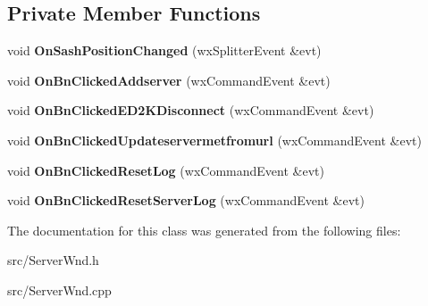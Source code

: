 \subsection*{Private Member Functions}
\begin{DoxyCompactItemize}
\item 
void {\bfseries OnSashPositionChanged} (wxSplitterEvent \&evt)\label{classCServerWnd_a209bde7a2852a45ce20ffd7cfff11358}

\item 
void {\bfseries OnBnClickedAddserver} (wxCommandEvent \&evt)\label{classCServerWnd_a58752743e91cf3ee19493b895c99cf4d}

\item 
void {\bfseries OnBnClickedED2KDisconnect} (wxCommandEvent \&evt)\label{classCServerWnd_a1a47fa31e9bd27b433d5df1235218f75}

\item 
void {\bfseries OnBnClickedUpdateservermetfromurl} (wxCommandEvent \&evt)\label{classCServerWnd_a62b8df871053eb3c71b635cb706f5a6d}

\item 
void {\bfseries OnBnClickedResetLog} (wxCommandEvent \&evt)\label{classCServerWnd_a84bb2c936b8138be6d76564ecc192ed2}

\item 
void {\bfseries OnBnClickedResetServerLog} (wxCommandEvent \&evt)\label{classCServerWnd_a1339abca10a1526049657a08e0264523}

\end{DoxyCompactItemize}


The documentation for this class was generated from the following files:\begin{DoxyCompactItemize}
\item 
src/ServerWnd.h\item 
src/ServerWnd.cpp\end{DoxyCompactItemize}

